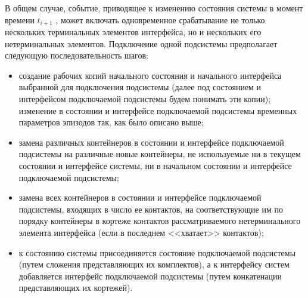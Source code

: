 В общем случае, событие, приводящее к изменению состояния системы в момент времени $ t_{i+1} $ , может включать одновременное срабатывание не только нескольких терминальных элементов интерфейса, но и нескольких его нетерминальных элементов. 
Подключение одной подсистемы предполагает следующую последовательность шагов:
\begin{itemize}
	\item создание рабочих копий начального состояния и начального интерфейса выбранной для подключения подсистемы (далее под состоянием и интерфейсом подключаемой подсистемы будем понимать эти копии); 
	изменение в состоянии и интерфейсе подключаемой подсистемы временных параметров эпизодов так, как было описано выше;
	\item замена различных контейнеров в состоянии и интерфейсе подключаемой подсистемы на различные новые контейнеры, не используемые ни в текущем состоянии и интерфейсе системы, ни в начальном состоянии и интерфейсе подключаемой подсистемы;
	\item замена всех контейнеров в состоянии и интерфейсе подключаемой подсистемы, входящих в число ее контактов, на соответствующие им по порядку контейнеры в кортеже контактов рассматриваемого нетерминального элемента интерфейса (если в последнем <<хватает>> контактов);
	\item к состоянию системы присоединяется состояние подключаемой подсистемы (путем сложения представляющих их комплектов), а к интерфейсу систем добавляется интерфейс подключаемой подсистемы (путем конкатенации представляющих их кортежей).
\end{itemize}

